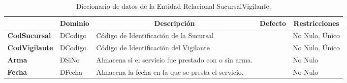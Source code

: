 \begin{table}[H]
\centering
\caption{Diccionario de datos de la Entidad Relacional SucursalVigilante.}
\label{tab-DiccR-2k}
\begin{tabular}{>{\bfseries}m{4.0cm}>{}m{3.0cm}>{}m{6.0cm}>{}m{5.0cm}>{}m{2.0cm}}
\toprule
\multicolumn{1}{c}{\textbf{Atributo}} & \multicolumn{1}{c}{\textbf{Dominio}} & \multicolumn{1}{c}{\textbf{Descripción}} & \multicolumn{1}{c}{\textbf{Defecto}} & \multicolumn{1}{c}{\textbf{Restricciones}} \\ \midrule
CodSucursal	&	DCodigo	&	Código de Identificación de la Sucursal	&		&	No Nulo, Único\\
CodVigilante	&	DCodigo	&	Código de Identificación del Vigilante	&		&	No Nulo, Único\\
Arma	&	DSiNo	&	Almacena si el servicio fue prestado con o sin arma.	&		&	No Nulo \\
Fecha	&	DFecha	&	Almacena la fecha en la que se presta el servicio.	&		& No Nulo	\\
\bottomrule
\end{tabular}
\end{table}